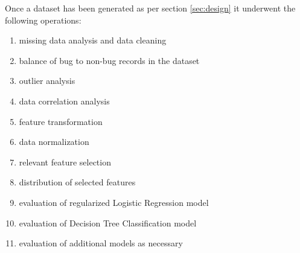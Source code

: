 Once a dataset has been generated as per section \ref{sec:design} it underwent the following operations:
\begin{enumerate}\label{lst:dataset-ops}
    \item missing data analysis and data cleaning \label{lst:dataset-ops.item:data-cleaning}
    \item balance of bug to non-bug records in the dataset \label{lst:dataset-ops.item:bug-to-non-bug-balance}
    \item outlier analysis \label{lst:dataset-ops.item:outliers}
    \item data correlation analysis \label{lst:dataset-ops.item:data-correlation}
    \item feature transformation \label{lst:dataset-ops.item:feature-transformation}
    \item data normalization \label{lst:dataset-ops.item:data-scaling}
    \item relevant feature selection \label{lst:dataset-ops.item:feature-selection}
    \item distribution of selected features \label{lst:dataset-ops.item:attribute-distribution}
    \item evaluation of regularized Logistic Regression model \label{lst:dataset-ops.item:ml-logistic-regression}
    \item evaluation of Decision Tree Classification model \label{lst:dataset-ops.item:ml-decision-tree}
    \item evaluation of additional models as necessary \label{lst:dataset-ops.item:ml-models-additional}
\end{enumerate}

